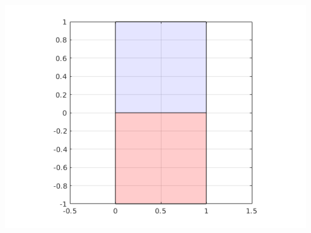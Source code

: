 \documentclass[MathsNotesBase.tex]{subfiles}
\begin{document}
{		\begin{center}
		\includegraphics[scale=0.85]{resources/img/GeometryOfMatrices_images/reflection.png}
		\end{center}
	}
	
\end{document}
